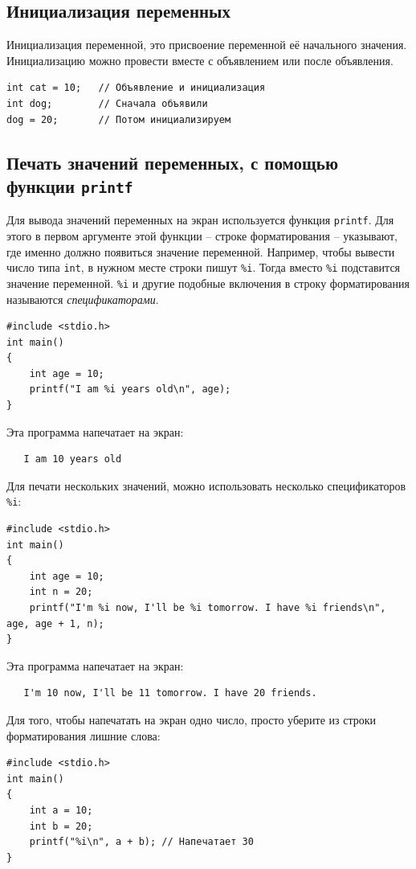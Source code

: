 \documentclass{article}
\begin{document}
\subsection*{Инициализация переменных}
Инициализация переменной, это присвоение переменной её начального значения. Инициализацию можно провести вместе с объявлением или после объявления.
\begin{lstlisting}
int cat = 10;	// Объявление и инициализация
int dog;		// Сначала объявили
dog = 20;       // Потом инициализируем
\end{lstlisting}

\subsection*{Печать значений переменных, с помощью функции \texttt{printf}}
Для вывода значений переменных на экран используется функция \texttt{printf}.
Для этого в первом аргументе этой функции -- строке форматирования -- указывают, где именно должно появиться значение переменной. Например, чтобы вывести число типа \texttt{int}, в нужном месте строки пишут \texttt{\%i}. Тогда вместо  \texttt{\%i}  подставится значение переменной. \texttt{\%i} и другие подобные включения в строку форматирования называются \textit{спецификаторами}.
\begin{lstlisting}
#include <stdio.h>
int main()
{
    int age = 10;
    printf("I am %i years old\n", age);
}
\end{lstlisting}
Эта программа напечатает на экран:
\begin{verbatim}
   I am 10 years old
\end{verbatim}
Для печати нескольких значений, можно использовать несколько спецификаторов \texttt{\%i}:
\begin{lstlisting}
#include <stdio.h>
int main()
{
    int age = 10;
    int n = 20;
    printf("I'm %i now, I'll be %i tomorrow. I have %i friends\n", age, age + 1, n);
}
\end{lstlisting}
Эта программа напечатает на экран:
\begin{verbatim}
   I'm 10 now, I'll be 11 tomorrow. I have 20 friends.
\end{verbatim}
Для того, чтобы напечатать на экран одно число, просто уберите из строки форматирования лишние слова:
\begin{lstlisting}
#include <stdio.h>
int main()
{
    int a = 10;
    int b = 20;
    printf("%i\n", a + b); // Напечатает 30
}
\end{lstlisting}
\end{document}
